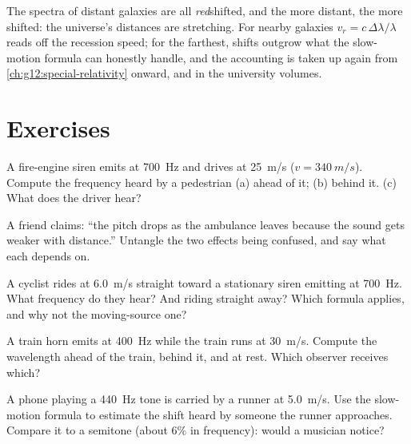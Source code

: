 \begin{remark}\label{rem:g12:doppler-effect:expansion}
The spectra of distant galaxies are all \emph{red}shifted, and the more distant, the more
shifted: the universe's distances are stretching. For nearby galaxies
$v_r = c\,\Delta\lambda/\lambda$ reads off the recession speed; for the farthest, shifts
outgrow what the slow-motion formula can honestly handle, and the accounting is taken up
again from \cref{ch:g12:special-relativity} onward, and in the university volumes.
\end{remark}

\section{Exercises}

\begin{exercise}[$\star$]\label{exo:g12:doppler-effect:1}
A fire-engine siren emits at \qty{700}{Hz} and drives at \qty{25}{m/s} ($v = \qty{340}{m/s}$).
Compute the frequency heard by a pedestrian (a) ahead of it; (b) behind it. (c) What does
the driver hear?
\end{exercise}

\begin{exercise}[$\star$]\label{exo:g12:doppler-effect:2}
A friend claims: ``the pitch drops as the ambulance leaves because the sound gets weaker
with distance.'' Untangle the two effects being confused, and say what each depends on.
\end{exercise}

\begin{exercise}[$\star$]\label{exo:g12:doppler-effect:3}
A cyclist rides at \qty{6.0}{m/s} straight toward a stationary siren emitting at \qty{700}{Hz}.
What frequency do they hear? And riding straight away? Which formula applies, and why not
the moving-source one?
\end{exercise}

\begin{exercise}[$\star$]\label{exo:g12:doppler-effect:4}
A train horn emits at \qty{400}{Hz} while the train runs at \qty{30}{m/s}. Compute the
wavelength ahead of the train, behind it, and at rest. Which observer receives which?
\end{exercise}

\begin{exercise}[$\star$]\label{exo:g12:doppler-effect:5}
A phone playing a \qty{440}{Hz} tone is carried by a runner at \qty{5.0}{m/s}. Use the
slow-motion formula to estimate the shift heard by someone the runner approaches. Compare
it to a semitone (about $6\%$ in frequency): would a musician notice?
\end{exercise}

